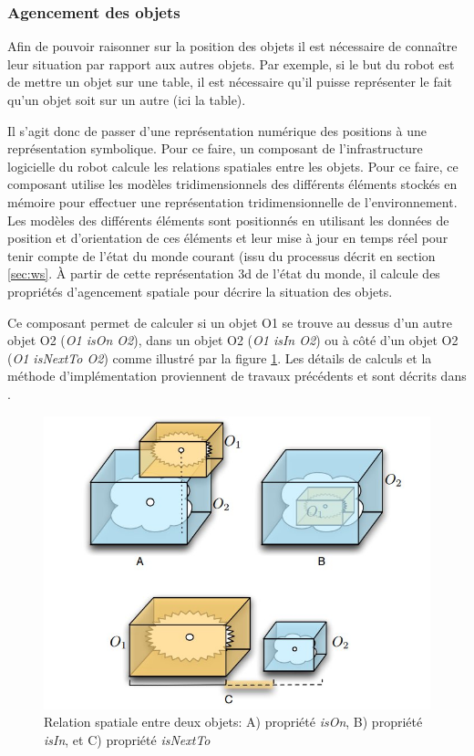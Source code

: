 \documentclass[a4paper,11pt,twoside]{StyleThese}
\begin{document}
\subsubsection{Agencement des objets}
\label{sec:agencement}
Afin de pouvoir raisonner sur la position des objets il est nécessaire de connaître leur situation par rapport aux autres objets. Par exemple, si le but du robot est de mettre un objet sur une table, il est nécessaire qu'il puisse représenter le fait qu'un objet soit sur un autre (ici la table).

Il s'agit donc de passer d'une représentation numérique des positions à une représentation symbolique. Pour ce faire, un composant de l'infrastructure logicielle du robot calcule les relations spatiales entre les objets. Pour ce faire, ce composant utilise les modèles tridimensionnels des différents éléments stockés en mémoire pour effectuer une représentation tridimensionnelle de l'environnement. Les modèles des différents éléments sont positionnés en utilisant les données de position et d'orientation de ces éléments et leur mise à jour en temps réel pour tenir compte de l'état du monde courant (issu du processus décrit en section \ref{sec:ws}. À partir de cette représentation 3d de l'état du monde, il calcule des propriétés d'agencement spatiale pour décrire la situation des objets.

Ce composant permet de calculer si un objet O1 se trouve au dessus d'un autre objet O2 (\textit{O1 isOn O2}), dans un objet O2 (\textit{O1 isIn O2}) ou à côté d'un objet O2 (\textit{O1 isNextTo O2}) comme illustré par la figure \ref{fig:spar}. Les détails de calculs et la méthode d'implémentation proviennent de travaux précédents et sont décrits dans \cite{sisbot2011situation}.


\begin{figure}[ht!]
 \centering
  \includegraphics[width=0.5\linewidth]{./img/spar.jpg} 
  \caption {Relation spatiale entre deux objets: A) propriété \textit{isOn}, B) propriété \textit{isIn}, et C) propriété \textit{isNextTo}}
  \label{fig:spar}
\end{figure}
\end{document}
